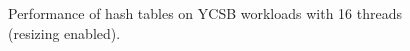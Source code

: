 \newcommand{\generateFirstSubfigureResizing}[4]{%
\generateSubfigureResizing{#1}{#2}{#3}{#4}%
}

\begin{figure}[h]
    \centering
    
    

    \caption{Performance of hash tables on YCSB workloads with 16 threads 
    (resizing enabled).}\label{fig:throughput_subfigures_resizing}
\end{figure} 
